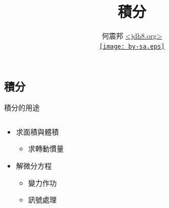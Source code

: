 \documentclass{beamer}
\title{積分}
\author[何震邦]{何震邦 \href{http://jdh8.org/}{\textless jdh8.org\textgreater}\\
    \href{http://creativecommons.org/licenses/by-sa/3.0/tw/deed.zh\textunderscore TW}{\texttt{[image: by-sa.eps]}}}
\theoremstyle{remark}
\begin{document}
\begin{CJK}{UTF8}{bsmi}
\maketitle

\section{積分}
\begin{frame}{積分的用途}
  \begin{columns}
    \begin{column}{0.5\textwidth}
      \begin{itemize}
	\item 求面積與體積
	  \begin{itemize}
	    \item 求轉動慣量
	  \end{itemize}
	\item 解微分方程
	  \begin{itemize}
	    \item 變力作功
	    \item 訊號處理
	  \end{itemize}
      \end{itemize}
    \end{column}
    \begin{column}{0.5\textwidth}
      \begin{center}

\end{center}
\end{column}
\end{columns}
\end{frame}
\end{CJK}
\end{document}
